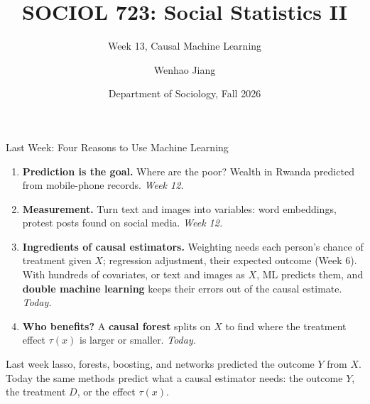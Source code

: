 \documentclass[aspectratio=169,11pt,xcolor=dvipsnames]{beamer}
\title[SOCIOL 723]{SOCIOL 723: Social Statistics II\\[-2pt]}
\subtitle{Week 13, Causal Machine Learning\\[-6pt]}
\author[Jiang]{Wenhao Jiang\vspace{-2.5em}}
\institute[Duke]{}
\date{Department of Sociology, Fall 2026}
\begin{document}
\begin{frame}[plain]
  \titlepage
\end{frame}

\begin{frame}{Last Week: Four Reasons to Use Machine Learning}
\begin{enumerate}\itemsep4pt
  \item {\color{gray}\textbf{Prediction is the goal.} Where are the poor? Wealth in Rwanda predicted
        from mobile-phone records. \emph{Week 12.}}
  \item {\color{gray}\textbf{Measurement.} Turn text and images into variables: word embeddings,
        protest posts found on social media. \emph{Week 12.}}
  \item \textbf{Ingredients of causal estimators.} Weighting needs each person's chance of
        treatment given $X$; regression adjustment, their expected outcome (Week 6). With
        hundreds of covariates, or text and images as $X$, ML predicts them, and \textbf{double
        machine learning} keeps their errors out of the causal estimate. \alert{\emph{Today.}}
  \item \textbf{Who benefits?} A \textbf{causal forest} splits on $X$ to find where the treatment
        effect $\tau(x)$ is larger or smaller. \alert{\emph{Today.}}
\end{enumerate}
\vskip6pt
{\small Last week lasso, forests, boosting, and networks predicted the outcome $Y$ from $X$. Today the same methods predict
what a causal estimator needs: the outcome $Y$, the treatment $D$, or the effect $\tau(x)$.}
\end{frame}
\end{document}
